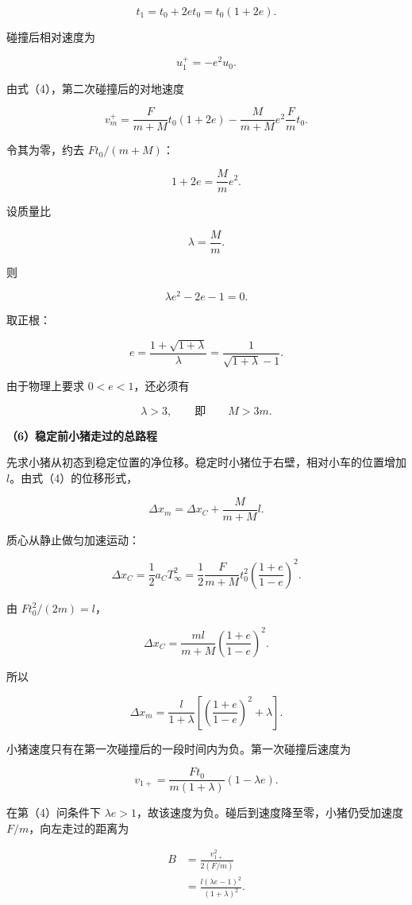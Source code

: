 \documentclass[12pt,a4paper,UTF8]{ctexart}
\begin{document}
\[
t_1=t_0+2et_0=t_0(1+2e).
\tag{19}
\]

碰撞后相对速度为

\[
u_1^+=-e^2u_0.
\tag{20}
\]

由式（4），第二次碰撞后的对地速度

\[
v_m^+
=\frac{F}{m+M}t_0(1+2e)
-\frac{M}{m+M}e^2\frac Fm t_0.
\]

令其为零，约去 \(Ft_0/(m+M)\)：

\[
1+2e=\frac Mm e^2.
\tag{21}
\]

设质量比

\[
\lambda=\frac Mm.
\]

则

\[
\lambda e^2-2e-1=0.
\]

取正根：

\[
\boxed{
e=\frac{1+\sqrt{1+\lambda}}{\lambda}
=\frac1{\sqrt{1+\lambda}-1}
}.
\tag{22}
\]

由于物理上要求 \(0<e<1\)，还必须有

\[
\boxed{\lambda>3},
\qquad\text{即}\qquad
\boxed{M>3m}.
\tag{23}
\]

\textbf{（6）稳定前小猪走过的总路程}

先求小猪从初态到稳定位置的净位移。稳定时小猪位于右壁，相对小车的位置增加
\(l\)。由式（4）的位移形式，

\[
\Delta x_m
=\Delta x_C+\frac{M}{m+M}l.
\tag{24}
\]

质心从静止做匀加速运动：

\[
\Delta x_C
=\frac12a_CT_\infty^2
=\frac12\frac{F}{m+M}
t_0^2\left(\frac{1+e}{1-e}\right)^2.
\]

由 \(Ft_0^2/(2m)=l\)，

\[
\Delta x_C
=\frac{ml}{m+M}
\left(\frac{1+e}{1-e}\right)^2.
\tag{25}
\]

所以

\[
\Delta x_m
=\frac{l}{1+\lambda}
\left[
\left(\frac{1+e}{1-e}\right)^2+\lambda
\right].
\tag{26}
\]

小猪速度只有在第一次碰撞后的一段时间内为负。第一次碰撞后速度为

\[
v_{1+}
=\frac{Ft_0}{m(1+\lambda)}
(1-\lambda e).
\tag{27}
\]

在第（4）问条件下
\(\lambda e>1\)，故该速度为负。碰后到速度降至零，小猪仍受加速度
\(F/m\)，向左走过的距离为

\[
\begin{aligned}
B
&=\frac{v_{1+}^2}{2(F/m)}\\
&=\frac{l(\lambda e-1)^2}{(1+\lambda)^2}.
\end{aligned}
\tag{28}
\]
\end{document}
